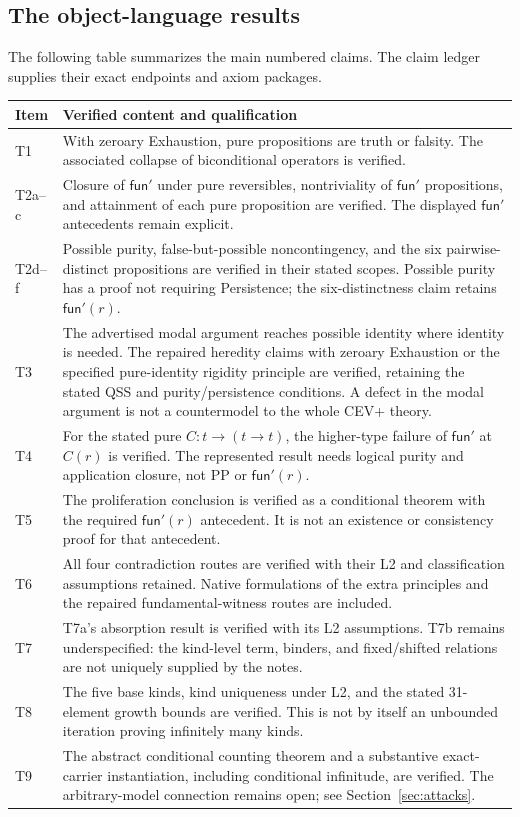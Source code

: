 \documentclass[12pt,leqno]{article}
\newcommand{\funp}{\mathsf{fun}'}
\begin{document}
\subsection{The object-language results}

The following table summarizes the main numbered claims. The claim
ledger supplies their exact endpoints and axiom packages.

\setlength{\tabcolsep}{4pt}
\renewcommand{\arraystretch}{1.08}
\begin{longtable}{@{}>{\raggedright\arraybackslash}p{0.65in}
  >{\raggedright\arraybackslash}p{5.65in}@{}}
\toprule
Item & Verified content and qualification\\
\midrule
\endhead
T1 & With zeroary Exhaustion, pure propositions are truth or falsity.
The associated collapse of biconditional operators is verified.\\
T2a--c & Closure of $\funp$ under pure reversibles, nontriviality of
$\funp$ propositions, and attainment of each pure proposition are verified.
The displayed $\funp$ antecedents remain explicit.\\
T2d--f & Possible purity, false-but-possible noncontingency, and the six
pairwise-distinct propositions are verified in their stated scopes.
Possible purity has a proof not requiring Persistence; the six-distinctness
claim retains $\funp(r)$.\\
T3 & The advertised modal argument reaches possible identity where identity
is needed. The repaired heredity claims with zeroary Exhaustion or the
specified pure-identity rigidity principle are verified, retaining the
stated QSS and purity/persistence conditions. A defect in the
modal argument is not a countermodel to the whole CEV+ theory.\\
T4 & For the stated pure $C:t\to(t\to t)$, the higher-type failure of
$\funp$ at $C(r)$ is verified. The represented result needs logical purity
and application closure, not PP or $\funp(r)$.\\
T5 & The proliferation conclusion is verified as a conditional theorem
with the required $\funp(r)$ antecedent. It is not an existence or
consistency proof for that antecedent.\\
T6 & All four contradiction routes are verified with their L2 and
classification assumptions retained. Native formulations of the extra
principles and the repaired fundamental-witness routes are included.\\
T7 & T7a's absorption result is verified with its L2 assumptions.
T7b remains underspecified: the kind-level term, binders, and fixed/shifted
relations are not uniquely supplied by the notes.\\
T8 & The five base kinds, kind uniqueness under L2, and the stated
31-element growth bounds are verified. This is not by itself an unbounded
iteration proving infinitely many kinds.\\
T9 & The abstract conditional counting theorem and a substantive
exact-carrier instantiation, including conditional infinitude, are verified.
The arbitrary-model connection remains open; see Section~\ref{sec:attacks}.\\
\bottomrule
\end{longtable}
\end{document}
